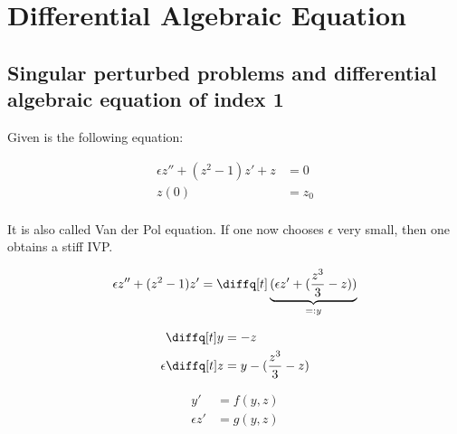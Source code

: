 \chapter{Differential Algebraic Equation}


\section{Singular perturbed problems and differential algebraic 
	equation of index 1}

\begin{example}
  Given is the following equation:

  \begin{equation}\begin{split}
    \epsilon z'' + (z^2 - 1) z' + z & = 0 \\
    z(0) & = z_0 \\
  \end{split}\end{equation}

	It is also called Van der Pol equation. If one now chooses $\epsilon$ 
	very small, then one obtains a stiff IVP.

  \begin{equation}
    \epsilon z'' + (z^2 - 1) z' = \diffq[t] \underbrace{(\epsilon z' + (\frac{z^3}{3} - z))}_{=: y}
  \end{equation}

  \begin{equation}\begin{split}
    \diffq[t] y & = -z \\
    \epsilon \diffq[t] z & = y - (\frac{z^3}{3} - z) \\
  \end{split}\end{equation}

  \begin{equation}\begin{split}
    y' & = f(y,z) \\
    \epsilon z' & = g(y,z) \\
  \end{split}\end{equation}


\end{example}

